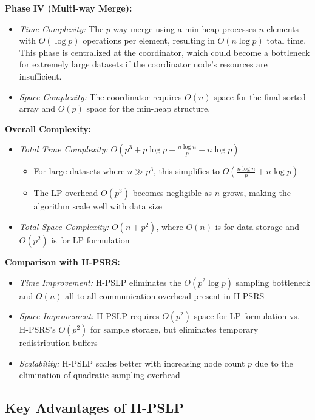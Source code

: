 \documentclass[]{interact}
\theoremstyle{plain}
\theoremstyle{definition}
\theoremstyle{remark}
\begin{document}
\textbf{Phase IV (Multi-way Merge):}
\begin{itemize}
\item \textit{Time Complexity:} The $p$-way merge using a min-heap processes $n$ elements with $O(\log p)$ operations per element, resulting in $O(n \log p)$ total time. This phase is centralized at the coordinator, which could become a bottleneck for extremely large datasets if the coordinator node's resources are insufficient.
\item \textit{Space Complexity:} The coordinator requires $O(n)$ space for the final sorted array and $O(p)$ space for the min-heap structure.
\end{itemize}

\textbf{Overall Complexity:}
\begin{itemize}
\item \textit{Total Time Complexity:} $O(p^3 + p \log p + \frac{n \log n}{p} + n \log p)$
\begin{itemize}
\item For large datasets where $n \gg p^3$, this simplifies to $O(\frac{n \log n}{p} + n \log p)$
\item The LP overhead $O(p^3)$ becomes negligible as $n$ grows, making the algorithm scale well with data size
\end{itemize}
\item \textit{Total Space Complexity:} $O(n + p^2)$, where $O(n)$ is for data storage and $O(p^2)$ is for LP formulation
\end{itemize}

\textbf{Comparison with H-PSRS:}
\begin{itemize}
\item \textit{Time Improvement:} H-PSLP eliminates the $O(p^2 \log p)$ sampling bottleneck and $O(n)$ all-to-all communication overhead present in H-PSRS
\item \textit{Space Improvement:} H-PSLP requires $O(p^2)$ space for LP formulation vs. H-PSRS's $O(p^2)$ for sample storage, but eliminates temporary redistribution buffers
\item \textit{Scalability:} H-PSLP scales better with increasing node count $p$ due to the elimination of quadratic sampling overhead
\end{itemize}

\subsection{Key Advantages of H-PSLP}
\end{document}
